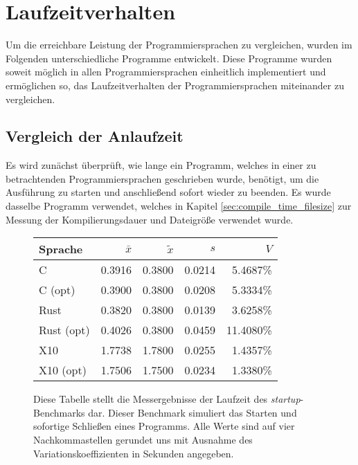 \section{Laufzeitverhalten}

Um die erreichbare Leistung der Programmiersprachen zu vergleichen,
wurden im Folgenden unterschiedliche Programme entwickelt.
Diese Programme wurden soweit möglich in allen Programmiersprachen einheitlich implementiert und ermöglichen so,
das Laufzeitverhalten der Programmiersprachen miteinander zu vergleichen.

\subsection{Vergleich der Anlaufzeit}

Es wird zunächst überprüft, wie lange ein Programm,
welches in einer zu betrachtenden Programmiersprachen geschrieben wurde,
benötigt, um die Ausführung zu starten und anschließend sofort wieder zu beenden.
Es wurde dasselbe Programm verwendet, welches in Kapitel \ref{sec:compile_time_filesize} zur Messung
der Kompilierungsdauer und Dateigröße verwendet wurde.

\begin{figure}[hb]
	\begin{center}
		\begin{tabular}{lrrrr}
			\toprule
			Sprache    & $\bar{x}$ & $\tilde{x}$ & $s$ & $V$ \\
			\midrule
			C          & 0.3916 & 0.3800 & 0.0214 &  5.4687\% \\
			C (opt)    & 0.3900 & 0.3800 & 0.0208 &  5.3334\% \\
			Rust       & 0.3820 & 0.3800 & 0.0139 &  3.6258\% \\
			Rust (opt) & 0.4026 & 0.3800 & 0.0459 & 11.4080\% \\
			X10        & 1.7738 & 1.7800 & 0.0255 &  1.4357\% \\
			X10 (opt)  & 1.7506 & 1.7500 & 0.0234 &  1.3380\% \\
			\bottomrule
		\end{tabular}
	\end{center}
	\caption{
		Diese Tabelle stellt die Messergebnisse der Laufzeit des \textit{startup}-Benchmarks dar.
		Dieser Benchmark simuliert das Starten und sofortige Schließen eines Programms.
		Alle Werte sind auf vier Nachkommastellen gerundet uns mit Ausnahme des Variationskoeffizienten
		in Sekunden angegeben.
	}
	\label{fig:startup_table}
\end{figure}

